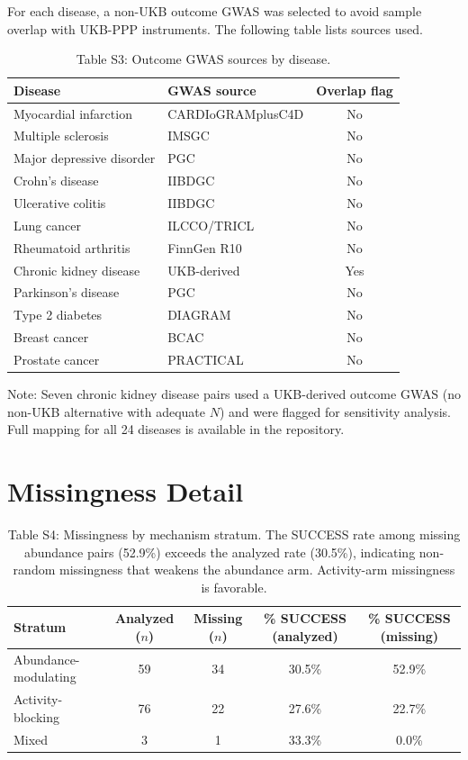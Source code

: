 \documentclass[11pt]{article}
\begin{document}
For each disease, a non-UKB outcome GWAS was selected to avoid sample overlap with UKB-PPP instruments. The following table lists sources used.

\vspace{1em}
\begin{table}[H]
\centering
\caption{Table S3: Outcome GWAS sources by disease.}
\label{tab:gwas_sources}
\small
\begin{tabular}{llc}
\toprule
Disease & GWAS source & Overlap flag \\
\midrule
Myocardial infarction & CARDIoGRAMplusC4D & No \\
Multiple sclerosis & IMSGC & No \\
Major depressive disorder & PGC & No \\
Crohn's disease & IIBDGC & No \\
Ulcerative colitis & IIBDGC & No \\
Lung cancer & ILCCO/TRICL & No \\
Rheumatoid arthritis & FinnGen R10 & No \\
Chronic kidney disease & UKB-derived & Yes \\
Parkinson's disease & PGC & No \\
Type 2 diabetes & DIAGRAM & No \\
Breast cancer & BCAC & No \\
Prostate cancer & PRACTICAL & No \\
\bottomrule
\end{tabular}

\vspace{0.5em}
{\small Note: Seven chronic kidney disease pairs used a UKB-derived outcome GWAS (no non-UKB alternative with adequate $N$) and were flagged for sensitivity analysis. Full mapping for all 24 diseases is available in the repository.}
\end{table}

\section{Missingness Detail}
\label{supp:missingness}

\vspace{1em}
\begin{table}[H]
\centering
\caption{Table S4: Missingness by mechanism stratum. The SUCCESS rate among missing abundance pairs (52.9\%) exceeds the analyzed rate (30.5\%), indicating non-random missingness that weakens the abundance arm. Activity-arm missingness is favorable.}
\label{tab:miss_mech}
\small
\begin{tabular}{lcccc}
\toprule
Stratum & Analyzed ($n$) & Missing ($n$) & \% SUCCESS (analyzed) & \% SUCCESS (missing) \\
\midrule
Abundance-modulating & 59 & 34 & 30.5\% & 52.9\% \\
Activity-blocking & 76 & 22 & 27.6\% & 22.7\% \\
Mixed & 3 & 1 & 33.3\% & 0.0\% \\
\bottomrule
\end{tabular}
\end{table}
\end{document}
